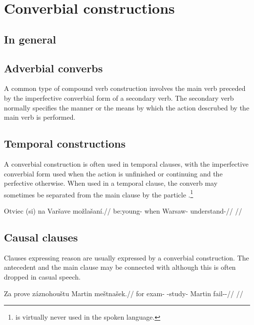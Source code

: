 \section{Converbial constructions}\label{converbs-syntax}

\subsection{In general}

\subsection{Adverbial converbs}

A common type of compound verb construction involves the main verb preceded by the imperfective converbial form of a secondary verb. The secondary verb normally specifies the manner or the means by which the action descrubed by the main verb is performed.


\subsection{Temporal constructions}

A converbial construction is often used in temporal clauses, with the imperfective converbial form used when the action is unfinished or continuing and the perfective otherwise. When used in a temporal clause, the converb may sometimes be separated from the main clause by the particle .\footnote{ is virtually never used in the spoken language.}

\pex
\begingl
\gla Otviec (si) na Varšave možlašaní.//
\glb be:young- when \Loc{} Warsaw-\Acc{} understand-//
\glft {}//
\endgl
\xe

\subsection{Causal clauses}

Clauses expressing reason are usually expressed by a converbial construction. The antecedent and the main clause may be connected with  although this is often dropped in casual speech.

\pex
\begingl
\gla Za prove záznohouštu Martin meštnašek.//
\glb for exam-\Acc{} \Neg{}-study- Martin fail-\Av{}-\Pf{}//
\glft {}//
\endgl
\xe


